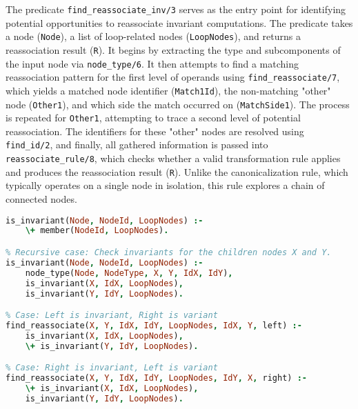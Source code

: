The predicate \texttt{find\_reassociate\_inv/3} serves as the entry point for identifying potential opportunities to reassociate invariant computations. The predicate takes a node (\texttt{Node}), a list of loop-related nodes (\texttt{LoopNodes}), and returns a reassociation result (\texttt{R}). It begins by extracting the type and subcomponents of the input node via \texttt{node\_type/6}. It then attempts to find a matching reassociation pattern for the first level of operands using \texttt{find\_reassociate/7}, which yields a matched node identifier (\texttt{Match1Id}), the non-matching "other" node (\texttt{Other1}), and which side the match occurred on (\texttt{MatchSide1}). The process is repeated for \texttt{Other1}, attempting to trace a second level of potential reassociation. The identifiers for these "other" nodes are resolved using \texttt{find\_id/2}, and finally, all gathered information is passed into \texttt{reassociate\_rule/8}, which checks whether a valid transformation rule applies and produces the reassociation result (\texttt{R}). Unlike the canonicalization rule, which typically operates on a single node in isolation, this rule explores a chain of connected nodes.

\begin{lstlisting}[language=Prolog]
% Base case: NodeId should not be in LoopNodes.
is_invariant(Node, NodeId, LoopNodes) :-
    \+ member(NodeId, LoopNodes).

% Recursive case: Check invariants for the children nodes X and Y.
is_invariant(Node, NodeId, LoopNodes) :-
    node_type(Node, NodeType, X, Y, IdX, IdY),
    is_invariant(X, IdX, LoopNodes),
    is_invariant(Y, IdY, LoopNodes).

% Case: Left is invariant, Right is variant
find_reassociate(X, Y, IdX, IdY, LoopNodes, IdX, Y, left) :-
    is_invariant(X, IdX, LoopNodes),
    \+ is_invariant(Y, IdY, LoopNodes).

% Case: Right is invariant, Left is variant
find_reassociate(X, Y, IdX, IdY, LoopNodes, IdY, X, right) :-
    \+ is_invariant(X, IdX, LoopNodes),
    is_invariant(Y, IdY, LoopNodes).
\end{lstlisting}

